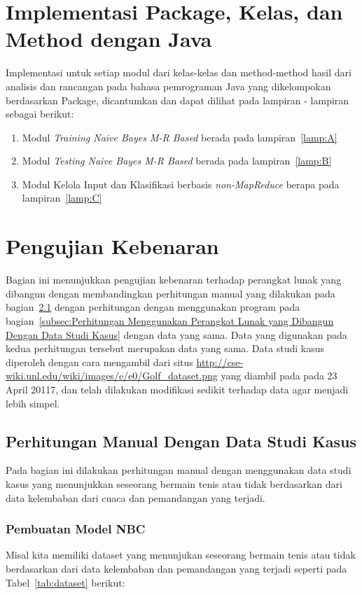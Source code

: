 \section{Implementasi Package, Kelas, dan Method dengan Java}
\label{sec:impl_code}

Implementasi untuk setiap modul dari kelas-kelas dan method-method hasil dari analisis dan rancangan pada bahasa pemrograman Java yang dikelompokan berdasarkan Package, dicantumkan dan dapat dilihat pada lampiran - lampiran sebagai berikut:
\begin{enumerate}
	\item Modul \textit{Training Naive Bayes M-R Based} berada pada lampiran~\ref{lamp:A}
	\item Modul \textit{Testing Naive Bayes M-R Based} berada pada lampiran~\ref{lamp:B}
	\item Modul Kelola Input dan Klasifikasi berbasis \textit{non-MapReduce} berapa pada lampiran~\ref{lamp:C}
\end{enumerate}

\section{Pengujian Kebenaran}
\label{sec:Pengujian Kebenaran}
Bagian ini menunjukkan pengujian kebenaran terhadap perangkat lunak yang dibangun dengan membandingkan perhitungan manual yang dilakukan pada bagian~\ref{subsec:Perhitungan Manual Dengan Data Studi Kasus} dengan perhitungan dengan menggunakan program pada bagian~\ref{subsec:Perhitungan Menggunakan Perangkat Lunak yang Dibangun Dengan Data Studi Kasus} dengan data yang sama. Data yang digunakan pada kedua perhitungan tersebut merupakan data yang sama. Data studi kasus diperoleh dengan cara mengambil dari situs \url{http://cse-wiki.unl.edu/wiki/images/e/e0/Golf_dataset.png} yang diambil pada pada 23 April 20117, dan telah dilakukan modifikasi sedikit terhadap data agar menjadi lebih simpel.

\subsection{Perhitungan Manual Dengan Data Studi Kasus}
\label{subsec:Perhitungan Manual Dengan Data Studi Kasus}
Pada bagian ini dilakukan perhitungan manual dengan menggunakan data studi kasus yang menunjukkan seseorang bermain tenis atau tidak berdasarkan dari data kelembaban dari cuaca dan pemandangan yang terjadi.

\subsubsection{Pembuatan Model NBC}
Misal kita memiliki dataset yang menunjukan seseorang bermain tenis atau tidak berdasarkan dari data kelembaban dan pemandangan yang terjadi seperti pada Tabel~\ref{tab:dataset} berikut: 
		
